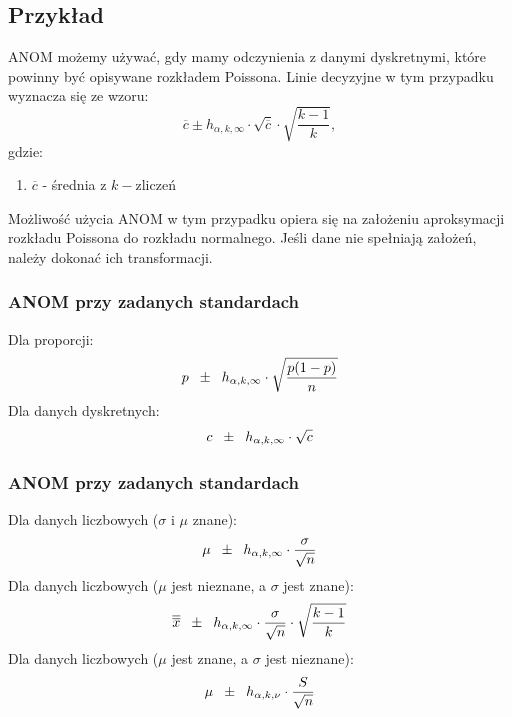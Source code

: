 \documentclass{beamer}
\begin{document}
\subsection{Przykład}
\begin{frame}
ANOM możemy używać, gdy mamy odczynienia z danymi dyskretnymi, które powinny być opisywane rozkładem Poissona. Linie decyzyjne w tym przypadku wyznacza się ze wzoru:
$$\overline{c} \pm h_{\alpha,k,\infty}\cdot\sqrt{\overline{c}}\cdot\sqrt{\frac{k-1}{k}},  $$
gdzie: 
\begin{enumerate}
		\item[] $\overline{c}$ - średnia z $k-$zliczeń 

	\end{enumerate} 
Możliwość użycia ANOM w tym przypadku opiera się na założeniu aproksymacji rozkładu Poissona do rozkładu normalnego. Jeśli dane nie spełniają założeń, należy dokonać ich transformacji.
\end{frame}


\begin{frame}
\frametitle{ANOM przy zadanych standardach}
Dla proporcji:
$$
p\hspace{2mm}\pm\hspace{2mm}h_{\alpha,k,\infty}\cdot\sqrt{\dfrac{p(1-p)}{n}}
$$
Dla danych dyskretnych:
$$
c\hspace{2mm}\pm\hspace{2mm}h_{\alpha,k,\infty}\cdot\sqrt{c}
$$
\end{frame}

\begin{frame}
\frametitle{ANOM przy zadanych standardach}
Dla danych liczbowych ($\sigma$ i $\mu$ znane):
$$
\mu\hspace{2mm}\pm\hspace{2mm}h_{\alpha,k,\infty}\cdot\dfrac{\sigma}{\sqrt{n}}
$$
Dla danych liczbowych ($\mu$ jest nieznane, a $\sigma$ jest znane):
$$
\overline{\overline{x}}\hspace{2mm}\pm\hspace{2mm}h_{\alpha,k,\infty}\cdot\dfrac{\sigma}{\sqrt{n}}\cdot\sqrt{\dfrac{k-1}{k}}
$$
Dla danych liczbowych ($\mu$ jest znane, a $\sigma$ jest nieznane):
$$
\mu\hspace{2mm}\pm\hspace{2mm}h_{\alpha,k,\nu}\cdot\dfrac{S}{\sqrt{n}}
$$
\end{frame}
\end{document}
